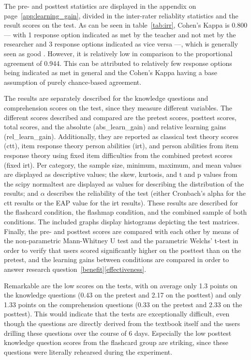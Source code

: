 The pre- and posttest statistics are displayed in the  appendix on page~\ref{app:learning_gain}, divided in the inter-rater reliablity statistics and the result scores on the test. As can be seen in table~\ref{tab:irr}, Cohen's Kappa is 0.800 --- with 1 response option indicated as met by the teacher and not met by the researcher and 3 response options indicated as vice versa ---, which is generally seen as good \cite{baarda}. However, it is relatively low in comparison to the proportional agreement of 0.944. This can be attributed to relatively few response options being indicated as met in general and the Cohen's Kappa having a base assumption of purely chance-based agreement.

The results are separately described for the knowledge questions and comprehension scores on the test, since they measure different variables. The different scores described and compared are the pretest scores, posttest scores, total scores, and the absolute (abs\_learn\_gain) and relative learning gains (rel\_learn\_gain). Additionally, they are reported as classical test theory scores (ctt), item response theory person abilities (irt), and person abilities from item response theory using fixed item difficulties from the combined pretest scores (fixed irt). Per category, the sample size, minimum, maximum, and mean values are displayed as descriptive values; the skew, kurtosis, and t and p values from the scipy normaltest are displayed as values for describing the distribution of the results; and $\alpha$ describes the reliability of the test (either Cronbach's alpha for the ctt results or the EAP value for the irt results). These results are described for the flashcard condition, the flashmap condition, and the combined sample of both conditions. The included graphs display histograms depicting the test matrices. Finally, the pre- and posttest scores are compared with each other by means of the non-parametric Mann-Whitney U test and the parametric Welchs' t-test in order to verify that users scored significantly higher on the posttest than on the pretest, and the learning gains between conditions are compared in order to answer research question~\ref{benefit}\ref{effectiveness}.

Remarkable are the low scores on the tests, with on average only 1.3 points on the knowledge questions (0.43 on the pretest and 2.17 on the posttest) and only 1.33 points on the comprehension questions (0.33 on the pretest and 2.33 on the posttest). This would indicate that the tests are exceptionally difficult, even though the questions are directly derived from the textbook itself and the users drilling these questions over the course of 6 days. Especially the low posttest knowledge question scores from the flashcard group are striking, since these questions were literally rehearsed during the experiment.

